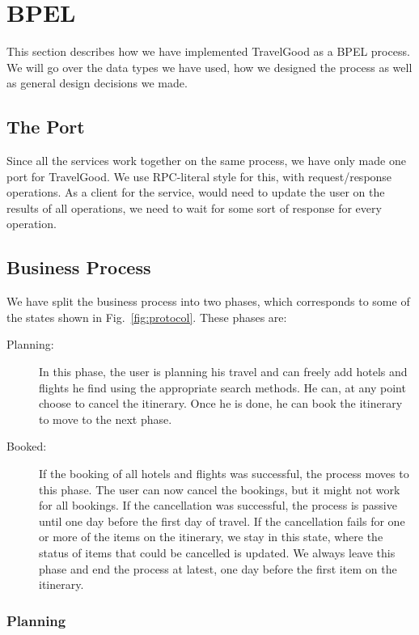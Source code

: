 \section{BPEL}
This section describes how we have implemented TravelGood as a BPEL process. We will go over the data types we have used, how we designed the process as well as general design decisions we made.

\subsection{The Port}
\pet

\noindent
Since all the services work together on the same process, we have only made one port for TravelGood. We use RPC-literal style for this, with request/response operations. As a client for the service, would need to update the user on the results of all operations, we need to wait for some sort of response for every operation.

\subsection{Business Process}
\mrb

\noindent
We have split the business process into two phases, which corresponds to some of the states shown in Fig.~\ref{fig:protocol}. These phases are:

\begin{description}
\item [Planning:] In this phase, the user is planning his travel and can freely add hotels and flights he find using the appropriate search methods. He can, at any point choose to cancel the itinerary. Once he is done, he can book the itinerary to move to the next phase.

\item[Booked:] If the booking of all hotels and flights was successful, the process moves to this phase. The user can now cancel the bookings, but it might not work for all bookings. If the cancellation was successful, the process is passive until one day before the first day of travel. If the cancellation fails for one or more of the items on the itinerary, we stay in this state, where the status of items that could be cancelled is updated. We always leave this phase and end the process at latest, one day before the first item on the itinerary.

\end{description}

\subsubsection{Planning}
\pet

